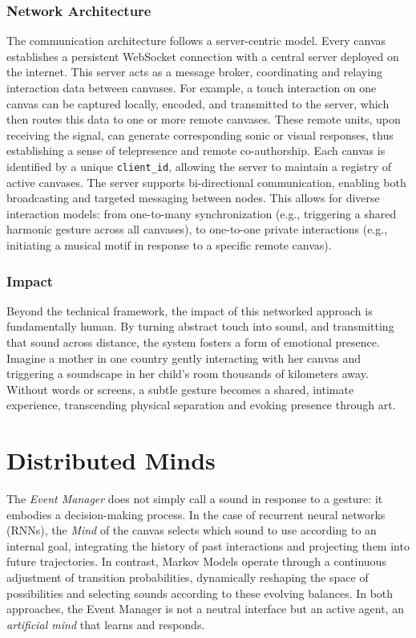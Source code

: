 \documentclass{article}
\begin{document}
\subsubsection{Network Architecture}
The communication architecture follows a server-centric model. Every canvas establishes a persistent WebSocket connection with a central server deployed on the internet. This server acts as a message broker, coordinating and relaying interaction data between canvases. For example, a touch interaction on one canvas can be captured locally, encoded, and transmitted to the server, which then routes this data to one or more remote canvases. These remote units, upon receiving the signal, can generate corresponding sonic or visual responses, thus establishing a sense of telepresence and remote co-authorship. \newline
Each canvas is identified by a unique \texttt{client\_id}, allowing the server to maintain a registry of active canvases. The server supports bi-directional communication, enabling both broadcasting and targeted messaging between nodes. This allows for diverse interaction models: from one-to-many synchronization (e.g., triggering a shared harmonic gesture across all canvases), to one-to-one private interactions (e.g., initiating a musical motif in response to a specific remote canvas).
\subsubsection{Impact}
Beyond the technical framework, the impact of this networked approach is fundamentally human. By turning abstract touch into sound, and transmitting that sound across distance, the system fosters a form of emotional presence. Imagine a mother in one country gently interacting with her canvas and triggering a soundscape in her child's room thousands of kilometers away. Without words or screens, a subtle gesture becomes a shared, intimate experience, transcending physical separation and evoking presence through art.

\section{Distributed Minds}

The \textit{Event Manager} does not simply call a sound in response to a gesture: it embodies a decision-making process. 
In the case of recurrent neural networks (RNNs), the \textit{Mind} of the canvas selects which sound to use according to an internal goal, integrating the history of past interactions and projecting them into future trajectories. 
In contrast, Markov Models operate through a continuous adjustment of transition probabilities, dynamically reshaping the space of possibilities and selecting sounds according to these evolving balances. 
In both approaches, the Event Manager is not a neutral interface but an active agent, an \textit{artificial mind} that learns and responds.
\end{document}
